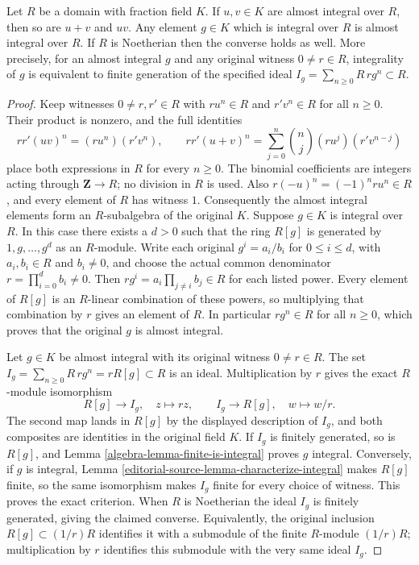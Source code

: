 \begin{lemma}
\label{editorial-source-lemma-almost-integral}
Let $R$ be a domain with fraction field $K$.
If $u, v \in K$ are almost integral over $R$, then so are
$u + v$ and $uv$. Any element $g \in K$ which is integral over $R$
is almost integral over $R$. If $R$ is Noetherian
then the converse holds as well. More precisely, for an almost
integral $g$ and any original witness $0\ne r\in R$, integrality
of $g$ is equivalent to finite generation of the specified ideal
$I_g=\sum_{n\geq0}R\,rg^n\subset R$.
\end{lemma}

\begin{proof}
Keep witnesses $0\ne r,r'\in R$ with $ru^n\in R$ and
$r'v^n\in R$ for all $n\geq0$. Their product is nonzero, and
the full identities
$$
rr'(uv)^n=(ru^n)(r'v^n),\qquad
rr'(u+v)^n=\sum_{j=0}^n\binom nj(ru^j)(r'v^{n-j})
$$
place both expressions in $R$ for every $n\geq0$. The binomial
coefficients are integers acting through $\mathbf Z\to R$;
no division in $R$ is used. Also $r(-u)^n=(-1)^nru^n\in R$,
and every element of $R$ has witness $1$. Consequently the
almost integral elements form an $R$-subalgebra of the original $K$.
Suppose $g \in K$ is integral over $R$.
In this case there exists a $d > 0$ such that
the ring $R[g]$ is generated by $1, g, \ldots, g^d$ as an $R$-module.
Write each original $g^i=a_i/b_i$ for $0\leq i\leq d$,
with $a_i,b_i\in R$ and $b_i\ne0$, and choose the actual common
denominator $r=\prod_{i=0}^d b_i\ne0$. Then
$rg^i=a_i\prod_{j\ne i}b_j\in R$ for each listed power.
Every element of $R[g]$ is an $R$-linear combination of these
powers, so multiplying that combination by $r$ gives an element
of $R$. In particular $rg^n\in R$ for all $n\geq0$,
which proves that the original $g$ is almost integral.

\medskip\noindent
Let $g\in K$ be almost integral with its original witness
$0\ne r\in R$. The set
$I_g=\sum_{n\geq0}R\,rg^n=rR[g]\subset R$ is an ideal.
Multiplication by $r$ gives the exact $R$-module isomorphism
$$
R[g]\longrightarrow I_g,\quad z\longmapsto rz,
\qquad I_g\longrightarrow R[g],\quad w\longmapsto w/r.
$$
The second map lands in $R[g]$ by the displayed description of
$I_g$, and both composites are identities in the original field $K$.
If $I_g$ is finitely generated, so is $R[g]$, and Lemma
\ref{algebra-lemma-finite-is-integral} proves $g$ integral. Conversely,
if $g$ is integral, Lemma \ref{editorial-source-lemma-characterize-integral}
makes $R[g]$ finite, so the same isomorphism makes $I_g$ finite
for every choice of witness. This proves the exact criterion.
When $R$ is Noetherian the ideal $I_g$ is finitely generated,
giving the claimed converse. Equivalently, the original inclusion
$R[g]\subset(1/r)R$ identifies it with a submodule of the finite
$R$-module $(1/r)R$; multiplication by $r$ identifies this
submodule with the very same ideal $I_g$.
\end{proof}

